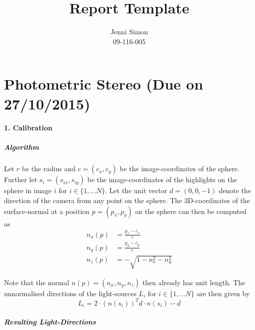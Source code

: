 \documentclass{paper}
\title{Report Template}
\author{Jenni Simon\\09-116-005}
\begin{document}
\maketitle


%

\section*{Photometric Stereo (Due on 27/10/2015)}



\paragraph{1. Calibration}

\subparagraph{Algorithm}

Let $r$ be the radius and $c=(c_x,c_y)$ be the image-coordinates of the
sphere. Further let $s_i=(s_{ix},s_{iy})$ be the image-coordinates of the
highlights on the sphere in image $i$ for $i\in{\{1,...N\}}$. Let the
unit vector $d=(0,0,-1)$ denote the direction of the camera from any point on the sphere.
The 3D-coordinates of the surface-normal at a position $p=(p_{x},p_{y})$ on the sphere can then be computed as 
\begin{equation} 
\begin{split}
  n_x(p)  &=  \frac{p_x-c_x}{r}      \\
  n_y (p) &=  \frac{p_y-c_y}{r}      \\
  n_z(p)  &=  -\sqrt{1-n_x^2-n_y^2}   
\end{split}   
\end{equation}

Note that the normal $n(p)=(n_x,n_y,n_z)$ then already has unit length.
The unnormalised directions of the light-sources $L_i$ for $i\in{\{1,...N\}}$ are then given by 
\begin{equation} 
L_i=2\cdot (n(s_i))^Td\cdot n(s_i)-d
\end{equation}


\subparagraph{Resulting Light-Directions} 
\end{document}
